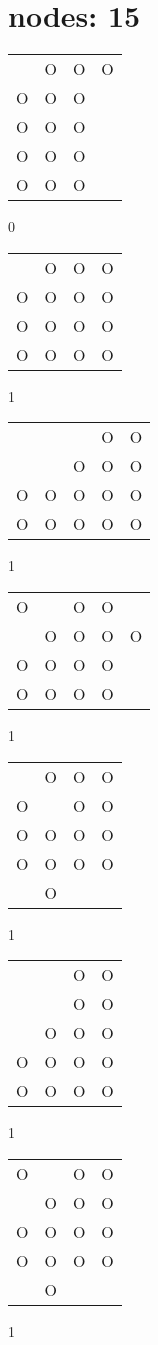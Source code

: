 \section{nodes: 15}
\begin{tabular}{|m{0.2cm}m{0.2cm}m{0.2cm}m{0.2cm}|}\hline
 &O&O&O\\
O&O&O& \\
O&O&O& \\
O&O&O& \\
O&O&O& \\
\hline\end{tabular}0
\begin{tabular}{|m{0.2cm}m{0.2cm}m{0.2cm}m{0.2cm}|}\hline
 &O&O&O\\
O&O&O&O\\
O&O&O&O\\
O&O&O&O\\
\hline\end{tabular}1
\begin{tabular}{|m{0.2cm}m{0.2cm}m{0.2cm}m{0.2cm}m{0.2cm}|}\hline
 & & &O&O\\
 & &O&O&O\\
O&O&O&O&O\\
O&O&O&O&O\\
\hline\end{tabular}1
\begin{tabular}{|m{0.2cm}m{0.2cm}m{0.2cm}m{0.2cm}m{0.2cm}|}\hline
O& &O&O& \\
 &O&O&O&O\\
O&O&O&O& \\
O&O&O&O& \\
\hline\end{tabular}1
\begin{tabular}{|m{0.2cm}m{0.2cm}m{0.2cm}m{0.2cm}|}\hline
 &O&O&O\\
O& &O&O\\
O&O&O&O\\
O&O&O&O\\
 &O& & \\
\hline\end{tabular}1
\begin{tabular}{|m{0.2cm}m{0.2cm}m{0.2cm}m{0.2cm}|}\hline
 & &O&O\\
 & &O&O\\
 &O&O&O\\
O&O&O&O\\
O&O&O&O\\
\hline\end{tabular}1
\begin{tabular}{|m{0.2cm}m{0.2cm}m{0.2cm}m{0.2cm}|}\hline
O& &O&O\\
 &O&O&O\\
O&O&O&O\\
O&O&O&O\\
 &O& & \\
\hline\end{tabular}1
